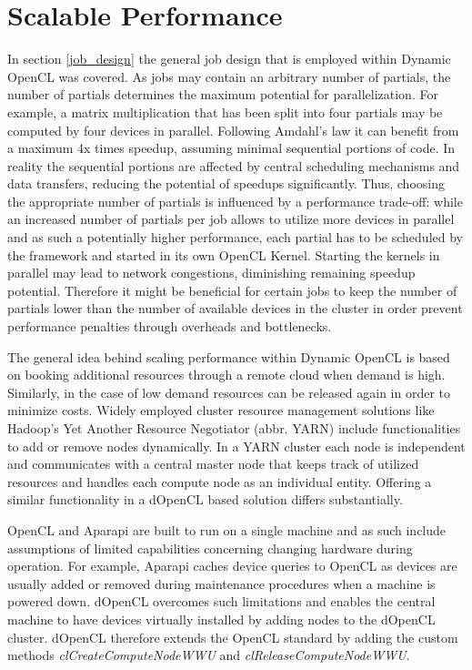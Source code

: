 \section{Scalable Performance}
\label{scalable_performance}
In section \ref{job_design} the general job design that is employed within Dynamic OpenCL was covered. As jobs may contain an arbitrary number of partials, the number of partials determines the maximum potential for parallelization. For example, a matrix multiplication that has been split into four partials may be computed by four devices in parallel. Following Amdahl's law it can benefit from a maximum 4x times speedup\cite{amdahl}, assuming minimal sequential portions of code. In reality the sequential portions are affected by central scheduling mechanisms and data transfers, reducing the potential of speedups significantly. Thus, choosing the appropriate number of partials is influenced by a performance trade-off: while an increased number of partials per job allows to utilize more devices in parallel and as such a potentially higher performance, each partial has to be scheduled by the framework and started in its own OpenCL Kernel. Starting the kernels in parallel may lead to network congestions, diminishing remaining speedup potential. Therefore it might be beneficial for certain jobs to keep the number of partials lower than the number of available devices in the cluster in order prevent performance penalties through overheads and bottlenecks.

The general idea behind scaling performance within Dynamic OpenCL is based on booking additional resources through a remote cloud when demand is high. Similarly, in the case of low demand resources can be released again in order to minimize costs. Widely employed cluster resource management solutions like Hadoop's Yet Another Resource Negotiator (abbr. YARN) include functionalities to add or remove nodes dynamically. In a YARN cluster each node is independent and communicates with a central master node that keeps track of utilized resources and handles each compute node as an individual entity. Offering a similar functionality in a dOpenCL based solution differs substantially.

OpenCL and Aparapi are built to run on a single machine and as such include assumptions of limited capabilities concerning changing hardware during operation. For example, Aparapi caches device queries to OpenCL as devices are usually added or removed during maintenance procedures when a machine is powered down. dOpenCL overcomes such limitations and enables the central machine to have devices virtually installed by adding nodes to the dOpenCL cluster. dOpenCL therefore extends the OpenCL standard by adding the custom methods \textit{clCreateComputeNodeWWU} and \textit{clReleaseComputeNodeWWU}.

